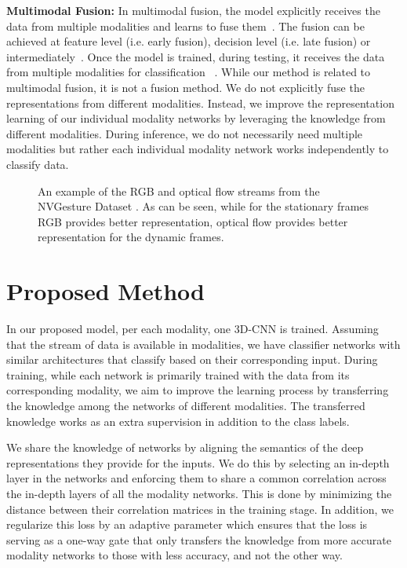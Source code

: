 \documentclass[10pt,twocolumn,letterpaper]{article}
\begin{document}
\noindent \textbf{Multimodal Fusion:}
In multimodal fusion, the model explicitly receives the data from multiple modalities and learns to fuse them~\cite{ngiam2011multimodal,abavisani2018multimodal,perera2018in2i}. The fusion can be achieved at feature level (i.e. early fusion), decision level (i.e. late fusion) or intermediately~\cite{ramachandram2017deep,abavisani2018deep}. Once the model is trained, during testing, it receives the data from multiple modalities for classification ~\cite{ramachandram2017deep,ngiam2011multimodal}.
While our method is related to multimodal fusion, it is not a fusion method.   We do not explicitly fuse the representations from different modalities. Instead, we improve the representation learning of our individual modality networks by leveraging the knowledge from different modalities.  During inference, we do not necessarily need multiple modalities but rather each individual modality network works independently to classify data.  

\begin{figure*}
\begin{center}
\end{center}
   \caption{An example of the RGB and optical flow streams from the NVGesture Dataset \cite{molchanov2016online}. As can be  seen, while for the stationary frames RGB provides better representation, optical flow provides better representation for the dynamic frames. }
\label{fig:2stream}
\end{figure*}

\section{Proposed Method}\label{sec:proposed}
 In our proposed model,  per each modality, one 3D-CNN is trained.  Assuming that the stream of data is available in  modalities, we have  classifier networks with similar architectures that classify based on their corresponding input.    During training, while each network is primarily trained with the data from its corresponding modality, we aim to improve the learning process by transferring the knowledge among the networks of different modalities.  The transferred knowledge works as an extra supervision in addition to the class labels.

We share the knowledge of networks by aligning the semantics of the deep representations they provide for the inputs.  We do this by selecting an in-depth layer in the networks and enforcing them to share a common correlation across the in-depth layers of all the modality networks. This is done by minimizing the distance between their correlation matrices in the training stage.  In addition, we regularize this loss by an adaptive parameter which ensures that the loss is serving as a one-way gate that only transfers the knowledge from more accurate modality networks to those with less accuracy, and not the other way. 
\end{document}
